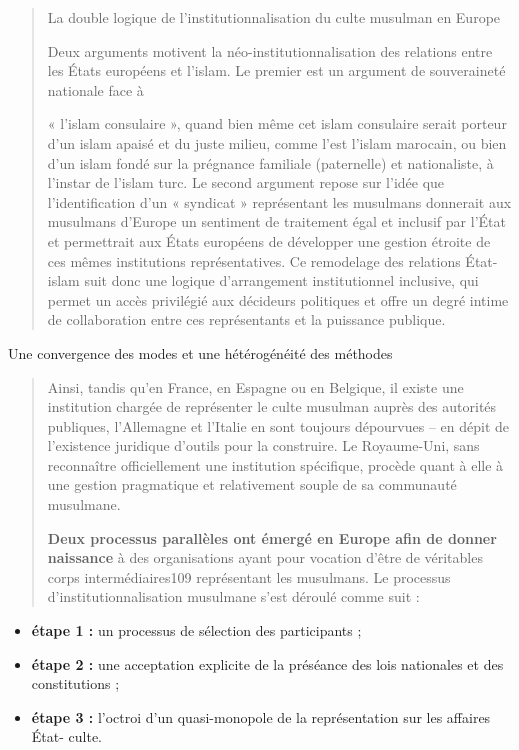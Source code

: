 \begin{quote}
La double logique de l'institutionnalisation du culte musulman en Europe

Deux arguments motivent la néo-institutionnalisation des relations entre
les États européens et l'islam. Le premier est un argument de
souveraineté nationale face à

« l'islam consulaire », quand bien même cet islam consulaire serait
porteur d'un islam apaisé et du juste milieu, comme l'est l'islam
marocain, ou bien d'un islam fondé sur la prégnance familiale
(paternelle) et nationaliste, à l'instar de l'islam turc. Le second
argument repose sur l'idée que l'identification d'un « syndicat »
représentant les musulmans donnerait aux musulmans d'Europe un sentiment
de traitement égal et inclusif par l'État et permettrait aux États
européens de développer une gestion étroite de ces mêmes institutions
représentatives. Ce remodelage des relations État-islam suit donc une
logique d'arrangement institutionnel inclusive, qui permet un accès
privilégié aux décideurs politiques et offre un degré intime de
collaboration entre ces représentants et la puissance publique.
\end{quote}

Une convergence des modes et une hétérogénéité des méthodes

\begin{quote}
Ainsi, tandis qu'en France, en Espagne ou en Belgique, il existe une
institution chargée de représenter le culte musulman auprès des
autorités publiques, l'Allemagne et l'Italie en sont toujours dépourvues
-- en dépit de l'existence juridique d'outils pour la construire. Le
Royaume-Uni, sans reconnaître officiellement une institution spécifique,
procède quant à elle à une gestion pragmatique et relativement souple de
sa communauté musulmane.

\textbf{Deux processus parallèles ont émergé en Europe afin de donner
naissance} à des organisations ayant pour vocation d'être de véritables
corps intermédiaires109 représentant les musulmans. Le processus
d'institutionnalisation musulmane s'est déroulé comme suit :
\end{quote}

\begin{itemize}
\item
  \textbf{étape 1 :} un processus de sélection des participants ;
\item
  \textbf{étape 2 :} une acceptation explicite de la préséance des lois
  nationales et des constitutions ;
\item
  \textbf{étape 3 :} l'octroi d'un quasi-monopole de la représentation
  sur les affaires État- culte.
\end{itemize}

